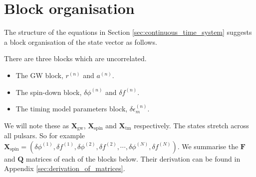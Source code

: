 \documentclass{tufte-handout} %
\begin{document}
\section{Block organisation}
The structure of the equations in Section \ref{sec:continuous_time_system} suggests a block organisation of the state vector as follows. \newline 

There are three blocks which are uncorrelated.
\begin{itemize}
	\item The GW block, $r^{(n)}$ and $a^{(n)}$.
	\item The spin-down block, $\delta \phi^{(n)}$ and $\delta f^{(n)}$.
	\item The timing model parameters block, $\delta \epsilon^{(n)}_{m}$.
\end{itemize}
We will note these as $\boldsymbol{X}_{\text{gw}}$, $\boldsymbol{X}_{\text{spin}}$ and $\boldsymbol{X}_{\text{tm}}$ respectively. The states stretch across all pulsars. So for example $\boldsymbol{X}_{\text{spin}}  = \left(\delta \phi^{(1)}, \delta f^{(1)}, \delta \phi^{(2)}, \delta f^{(2)}, \cdots, \delta \phi^{(N)}, \delta f^{(N)}\right)$. We summarise the $\boldsymbol{F}$ and $\boldsymbol{Q}$ matrices of each of the blocks below. Their derivation can be found in Appendix \ref{sec:derivation_of_matrices}.
\end{document}

